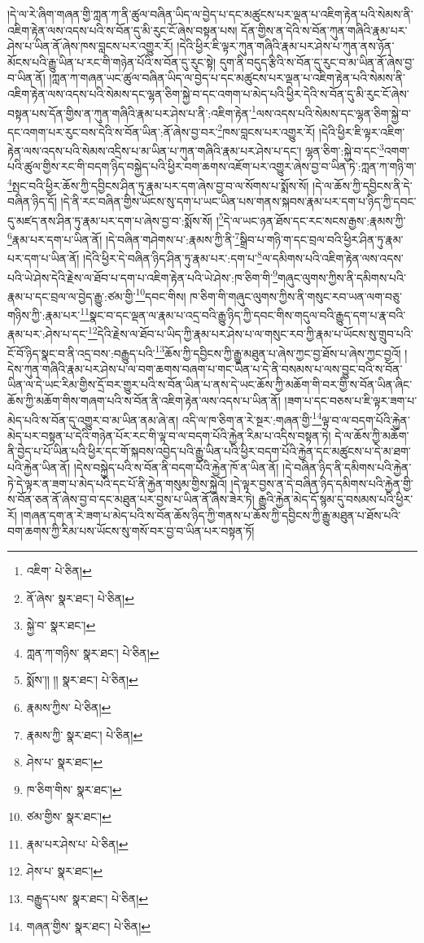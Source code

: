 །དེ་ལ་རེ་ཞིག་གཞན་གྱི་ཀླན་ཀ་ནི་ཚུལ་བཞིན་ཡིད་ལ་བྱེད་པ་དང་མཚུངས་པར་ལྡན་པ་འཇིག་རྟེན་པའི་སེམས་ནི་འཇིག་རྟེན་ལས་འདས་པའི་ས་བོན་དུ་མི་རུང་ངོ་ཞེས་བསྟན་པས། དོན་གྱིས་ན་དེའི་ས་བོན་ཀུན་གཞིའི་རྣམ་པར་ཤེས་པ་ཡིན་ནོ་ཞེས་ཁས་བླངས་པར་འགྱུར་རོ། །དེའི་ཕྱིར་ཇི་ལྟར་ཀུན་གཞིའི་རྣམ་པར་ཤེས་པ་ཀུན་ནས་ཉོན་མོངས་པའི་རྒྱུ་ཡིན་པ་རང་གི་གཉེན་པོའི་ས་བོན་དུ་རུང་སྟེ། དུག་ནི་བདུད་རྩིའི་ས་བོན་དུ་རུང་བ་མ་ཡིན་ནོ་ཞེས་བྱ་བ་ཡིན་ནོ། །ཀླན་ཀ་གཞན་ཡང་ཚུལ་བཞིན་ཡིད་ལ་བྱེད་པ་དང་མཚུངས་པར་ལྡན་པ་འཇིག་རྟེན་པའི་སེམས་ནི་འཇིག་རྟེན་ལས་འདས་པའི་སེམས་དང་ལྷན་ཅིག་སྐྱེ་བ་དང་འགག་པ་མེད་པའི་ཕྱིར་དེའི་ས་བོན་དུ་མི་རུང་ངོ་ཞེས་བསྟན་པས་དོན་གྱིས་ན་ཀུན་གཞིའི་རྣམ་པར་ཤེས་པ་ནི་:འཇིག་རྟེན་\footnote{འཇིག་  པེ་ཅིན། }ལས་འདས་པའི་སེམས་དང་ལྷན་ཅིག་སྐྱེ་བ་དང་འགག་པར་རུང་བས་དེའི་ས་བོན་ཡིན་:ནོ་ཞེས་བྱ་བར་\footnote{ནོ་ཞེས་  སྣར་ཐང་།  པེ་ཅིན། }ཁས་བླངས་པར་འགྱུར་རོ། །དེའི་ཕྱིར་ཇི་ལྟར་འཇིག་རྟེན་ལས་འདས་པའི་སེམས་འདྲིས་པ་མ་ཡིན་པ་ཀུན་གཞིའི་རྣམ་པར་ཤེས་པ་དང་། ལྷན་ཅིག་:སྐྱེ་བ་དང་\footnote{སྐྱེ་བ་  སྣར་ཐང་། }འགག་པའི་ཚུལ་གྱིས་རང་གི་བདག་ཉིད་བསྐྱེད་པའི་ཕྱིར་བག་ཆགས་འཇོག་པར་འགྱུར་ཞེས་བྱ་བ་ཡིན་ཏེ་:ཀླན་ཀ་གཉི་ག་\footnote{ཀླན་ཀ་གཉིས་  སྣར་ཐང་།  པེ་ཅིན། }སྤང་བའི་ཕྱིར་ཆོས་ཀྱི་དབྱིངས་ཤིན་ཏུ་རྣམ་པར་དག་ཞེས་བྱ་བ་ལ་སོགས་པ་སྨོས་སོ། །དེ་ལ་ཆོས་ཀྱི་དབྱིངས་ནི་དེ་བཞིན་ཉིད་དོ། །དེ་ནི་རང་བཞིན་གྱིས་ཡོངས་སུ་དག་པ་ཡང་ཡིན་པས་གནས་སྐབས་རྣམ་པར་དག་པ་ཉིད་ཀྱི་དབང་དུ་མཛད་ནས་ཤིན་ཏུ་རྣམ་པར་དག་པ་ཞེས་བྱ་བ་:སྨོས་སོ། །\footnote{སྨོས་།། །།  སྣར་ཐང་།  པེ་ཅིན། }དེ་ལ་ཡང་ཉན་ཐོས་དང་རང་སངས་རྒྱས་:རྣམས་ཀྱི་\footnote{རྣམས་ཀྱིས་  པེ་ཅིན། }རྣམ་པར་དག་པ་ཡིན་ནོ། །དེ་བཞིན་གཤེགས་པ་:རྣམས་ཀྱི་ནི་\footnote{རྣམས་ཀྱི་  སྣར་ཐང་།  པེ་ཅིན། }སྒྲིབ་པ་གཉི་ག་དང་བྲལ་བའི་ཕྱིར་ཤིན་ཏུ་རྣམ་པར་དག་པ་ཡིན་ནོ། །དེའི་ཕྱིར་དེ་བཞིན་ཉིད་ཤིན་ཏུ་རྣམ་པར་:དག་པ་\footnote{ཤེས་པ་  སྣར་ཐང་། }ལ་དམིགས་པའི་འཇིག་རྟེན་ལས་འདས་པའི་ཡེ་ཤེས་དེའི་རྗེས་ལ་ཐོབ་པ་དག་པ་འཇིག་རྟེན་པའི་ཡེ་ཤེས་:ཁ་ཅིག་གི་\footnote{ཁ་ཅིག་གིས་  སྣར་ཐང་། }གཞུང་ལུགས་ཀྱིས་ནི་དམིགས་པའི་རྣམ་པ་དང་བྲལ་ལ་བྱེད་རྒྱུ་:ཙམ་གྱི་\footnote{ཙམ་གྱིས་  སྣར་ཐང་། }དབང་གིས། ཁ་ཅིག་གི་གཞུང་ལུགས་ཀྱིས་ནི་གསུང་རབ་ཡན་ལག་བཅུ་གཉིས་ཀྱི་:རྣམ་པར་\footnote{རྣམ་པར་ཤེས་པ་  པེ་ཅིན། }སྣང་བ་དང་ལྡན་ལ་རྣམ་པ་འདྲ་བའི་རྒྱུ་ཉིད་ཀྱི་དབང་གིས་གདུལ་བའི་རྒྱུད་དག་པ་རྣ་བའི་རྣམ་པར་:ཤེས་པ་དང་\footnote{ཤེས་པ་  སྣར་ཐང་། }དེའི་རྗེས་ལ་ཐོབ་པ་ཡིད་ཀྱི་རྣམ་པར་ཤེས་པ་ལ་གསུང་རབ་ཀྱི་རྣམ་པ་ཡོངས་སུ་གྲུབ་པའི་ངོ་བོ་ཉིད་སྣང་བ་ནི་འདྲ་བས་:བརྒྱུད་པའི་\footnote{བརྒྱུད་པས་  སྣར་ཐང་།  པེ་ཅིན། }ཆོས་ཀྱི་དབྱིངས་ཀྱི་རྒྱུ་མཐུན་པ་ཞེས་ཀྱང་བྱ་ཐོས་པ་ཞེས་ཀྱང་བྱའོ། །དེས་ཀུན་གཞིའི་རྣམ་པར་ཤེས་པ་ལ་བག་ཆགས་བཞག་པ་གང་ཡིན་པ་དེ་ནི་བསམས་པ་ལས་བྱུང་བའི་ས་བོན་ཡིན་ལ་དེ་ཡང་རིམ་གྱིས་དྲོ་བར་གྱུར་པའི་ས་བོན་ཡིན་པ་ནས་དེ་ཡང་ཆོས་ཀྱི་མཆོག་གི་བར་གྱི་ས་བོན་ཡིན་ཞིང་ཆོས་ཀྱི་མཆོག་གིས་གཞག་པའི་ས་བོན་ནི་འཇིག་རྟེན་ལས་འདས་པ་ཡིན་ནོ། །ཟག་པ་དང་བཅས་པ་ཇི་ལྟར་ཟག་པ་མེད་པའི་ས་བོན་དུ་འགྱུར་བ་མ་ཡིན་ནམ་ཞེ་ན། འདི་ལ་ཁ་ཅིག་ན་རེ་སྔར་:གཞན་གྱི་\footnote{གཞན་གྱིས་  སྣར་ཐང་།  པེ་ཅིན། }ལྟ་བ་ལ་བདག་པོའི་རྐྱེན་མེད་པར་བསྟན་པ་དེའི་གཉེན་པོར་རང་གི་ལྟ་བ་ལ་བདག་པོའི་རྐྱེན་རིམ་པ་འདིས་བསྟན་ཏེ། དེ་ལ་ཆོས་ཀྱི་མཆོག་ནི་བྱེད་པ་པོ་ཡིན་པའི་ཕྱིར་དང་གོ་སྐབས་འབྱེད་པའི་རྒྱུ་ཡིན་པའི་ཕྱིར་བདག་པོའི་རྐྱེན་དང་མཚུངས་པ་དེ་མ་ཐག་པའི་རྐྱེན་ཡིན་ནོ། །དེས་བསྐྱེད་པའི་ས་བོན་ནི་བདག་པོའི་རྐྱེན་ཁོ་ན་ཡིན་ནོ། །དེ་བཞིན་ཉིད་ནི་དམིགས་པའི་རྐྱེན་ཏེ་དེ་ལྟར་ན་ཟག་པ་མེད་པའི་དང་པོ་ནི་རྐྱེན་གསུམ་གྱིས་སྐྱེའོ། །དེ་ལྟར་བྱས་ན་དེ་བཞིན་ཉིད་དམིགས་པའི་རྐྱེན་གྱི་ས་བོན་ཅན་ནོ་ཞེས་བྱ་བ་དང་མཐུན་པར་བྱས་པ་ཡིན་ནོ་ཞེས་ཟེར་ཏེ། རྒྱུའི་རྐྱེན་མེད་དོ་སྙམ་དུ་བསམས་པའི་ཕྱིར་རོ། །གཞན་དག་ན་རེ་ཟག་པ་མེད་པའི་ས་བོན་ཆོས་ཉིད་ཀྱི་གནས་པ་ཆོས་ཀྱི་དབྱིངས་ཀྱི་རྒྱུ་མཐུན་པ་ཐོས་པའི་བག་ཆགས་ཀྱི་རིམ་པས་ཡོངས་སུ་གསོ་བར་བྱ་བ་ཡིན་པར་བསྟན་ཏོ། 